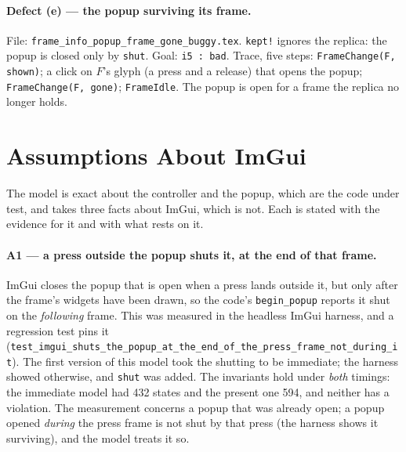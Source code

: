 \documentclass[a4paper,10pt,fleqn]{article}
\begin{document}
\paragraph{Defect (e) --- the popup surviving its frame.}
File: \texttt{frame\_info\_popup\_frame\_gone\_buggy.tex}.  \texttt{kept!}
ignores the replica: the popup is closed only by \texttt{shut}.  Goal:
\texttt{i5 : bad}.  Trace, five steps: \texttt{FrameChange(F, shown)}; a click
on $F$'s glyph (a press and a release) that opens the popup;
\texttt{FrameChange(F, gone)}; \texttt{FrameIdle}.  The popup is open for a
frame the replica no longer holds.

\section{Assumptions About ImGui}
\label{sec:assume}

The model is exact about the controller and the popup, which are the code under
test, and takes three facts about ImGui, which is not.  Each is stated with the
evidence for it and with what rests on it.

\paragraph{A1 --- a press outside the popup shuts it, at the end of that frame.}
ImGui closes the popup that is open when a press lands outside it, but only
after the frame's widgets have been drawn, so the code's \texttt{begin\_popup}
reports it shut on the \emph{following} frame.  This was measured in the
headless ImGui harness, and a regression test pins it
(\texttt{test\_imgui\_shuts\_the\_popup\_at\_the\_end\_of\_the\_press\_frame\_not\_during\_it}).
The first version of this model took the shutting to be immediate; the harness
showed otherwise, and \texttt{shut} was added.  The invariants hold under
\emph{both} timings: the immediate model had 432 states and the present one 594,
and neither has a violation.  The measurement concerns a popup that was already
open; a popup opened \emph{during} the press frame is not shut by that press
(the harness shows it surviving), and the model treats it so.
\end{document}
